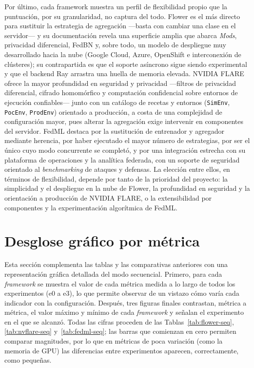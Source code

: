 Por último, cada framework muestra un perfil de flexibilidad propio que la puntuación,
por su granularidad, no captura del todo. Flower es el más directo para sustituir la
estrategia de agregación —basta con cambiar una clase en el servidor— y su documentación
revela una superficie amplia que abarca \textit{Mods}, privacidad diferencial, FedBN y,
sobre todo, un modelo de despliegue muy desarrollado hacia la nube (Google Cloud, Azure,
OpenShift e interconexión de clústeres); su contrapartida es que el soporte asíncrono
sigue siendo experimental y que el backend Ray arrastra una huella de memoria elevada.
NVIDIA FLARE ofrece la mayor profundidad en seguridad y privacidad —filtros de privacidad
diferencial, cifrado homomórfico y computación confidencial sobre entornos de ejecución
confiables— junto con un catálogo de recetas y entornos (\texttt{SimEnv}, \texttt{PocEnv},
\texttt{ProdEnv}) orientado a producción, a costa de una complejidad de configuración
mayor, pues alterar la agregación exige intervenir en componentes del servidor. FedML
destaca por la sustitución de entrenador y agregador mediante herencia, por haber
ejecutado el mayor número de estrategias, por ser el único cuyo modo concurrente se
completó, y por una integración estrecha con su plataforma de operaciones y la analítica
federada, con un soporte de seguridad orientado al \textit{benchmarking} de ataques y
defensas. La elección entre ellos, en términos de flexibilidad, depende por tanto de la
prioridad del proyecto: la simplicidad y el despliegue en la nube de Flower, la
profundidad en seguridad y la orientación a producción de NVIDIA FLARE, o la
extensibilidad por componentes y la experimentación algorítmica de FedML.


\section{Desglose gráfico por métrica}\label{sec:desglose-grafico}

Esta sección complementa las tablas y las comparativas anteriores con una representación
gráfica detallada del modo secuencial. Primero, para cada \textit{framework} se muestra el
valor de cada métrica medida a lo largo de todos los experimentos (e0 a e3), lo que permite
observar de un vistazo cómo varía cada indicador con la configuración. Después, tres figuras
finales contrastan, métrica a métrica, el valor máximo y mínimo de cada \textit{framework} y
señalan el experimento en el que se alcanzó. Todas las cifras proceden de las
Tablas~\ref{tab:flower-seq}, \ref{tab:nvflare-seq} y~\ref{tab:fedml-seq}; las barras que
comienzan en cero permiten comparar magnitudes, por lo que en métricas de poca variación
(como la memoria de GPU) las diferencias entre experimentos aparecen, correctamente, como
pequeñas.

